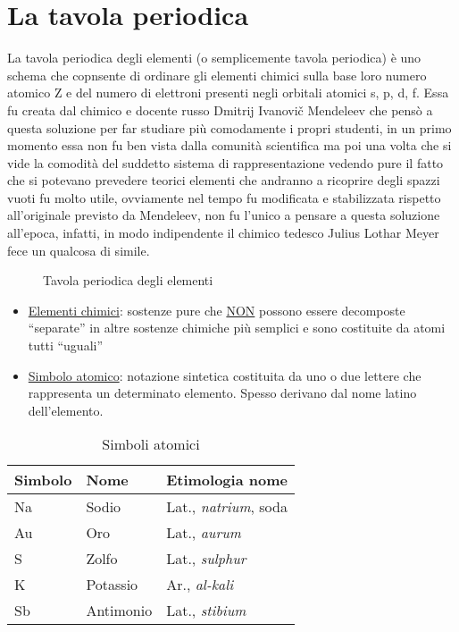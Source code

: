 \section{La tavola periodica}
\label{sec:tavper}
\begin{defi}
  La tavola periodica degli elementi (o semplicemente tavola periodica) è uno schema che copnsente di ordinare
  gli elementi chimici sulla base loro numero atomico Z e del numero di elettroni presenti negli orbitali
  atomici s, p, d, f. Essa fu creata dal chimico e docente russo Dmitrij Ivanovič Mendeleev che pensò a questa
  soluzione per far studiare più comodamente i propri studenti, in un primo momento essa non fu ben vista
  dalla comunità scientifica ma poi una volta che si vide la comodità del suddetto sistema di rappresentazione
  vedendo pure il fatto che si potevano prevedere teorici elementi che andranno a ricoprire degli spazzi vuoti
  fu molto utile, ovviamente nel tempo fu modificata e stabilizzata rispetto all'originale previsto da
  Mendeleev, non fu l'unico a pensare a questa soluzione all'epoca, infatti, in modo indipendente il chimico
  tedesco Julius Lothar Meyer fece un qualcosa di simile.
\end{defi}
\begin{figure}[ht!]
  \centering
  \resizebox{5.5in}{!}{} 
  \caption{Tavola periodica degli elementi}
  \label{fig:tavper}
\end{figure}
\begin{itemize}
\item \underline{Elementi chimici}: sostenze pure che \underline{NON} possono essere decomposte ``separate'' in altre
  sostenze chimiche più semplici e sono costituite da atomi tutti ``uguali''
\item \underline{Simbolo atomico}: notazione sintetica costituita da uno o due lettere che rappresenta un determinato
  elemento. Spesso derivano dal nome latino dell'elemento.
\end{itemize}
\begin{table}[ht!]
  \centering
  \begin{tabular}{lll}
    \textbf{Simbolo}& \textbf{Nome} & \textbf{Etimologia nome}\\\hline
    Na & Sodio & Lat., \textit{natrium}, soda\\\hline
    Au & Oro & Lat., \textit{aurum}\\\hline
    S  & Zolfo & Lat., \textit{sulphur}\\\hline
    K  & Potassio & Ar., \textit{al-kali}\\\hline
    Sb & Antimonio & Lat., \textit{stibium}\\\hline
  \end{tabular}
  \caption{Simboli atomici}
  \label{tab:simatom}
\end{table}


